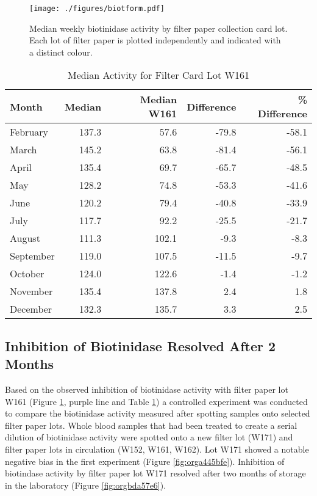 \documentclass[review]{elsarticle}
\begin{document}
\begin{figure}[htbp]
\centering
\texttt{[image: ./figures/biotform.pdf]}
\caption{\label{fig:org25d6d79}Median weekly biotinidase activity by filter paper collection card lot. Each lot of filter paper is plotted independently and indicated with a distinct colour.}
\end{figure}

\clearpage

\begin{table}[ht]
\centering
\begin{tabular}{lrrrr}
  \hline
Month & Median & Median W161 & Difference & \% Difference \\ 
  \hline
February & 137.3 & 57.6 & -79.8 & -58.1 \\ 
  March & 145.2 & 63.8 & -81.4 & -56.1 \\ 
  April & 135.4 & 69.7 & -65.7 & -48.5 \\ 
  May & 128.2 & 74.8 & -53.3 & -41.6 \\ 
  June & 120.2 & 79.4 & -40.8 & -33.9 \\ 
  July & 117.7 & 92.2 & -25.5 & -21.7 \\ 
  August & 111.3 & 102.1 & -9.3 & -8.3 \\ 
  September & 119.0 & 107.5 & -11.5 & -9.7 \\ 
  October & 124.0 & 122.6 & -1.4 & -1.2 \\ 
  November & 135.4 & 137.8 & 2.4 & 1.8 \\ 
  December & 132.3 & 135.7 & 3.3 & 2.5 \\ 
   \hline
\end{tabular}
\caption{Median Activity for Filter Card Lot W161} 
\label{tab:w161_months}
\end{table}

\subsection*{Inhibition of Biotinidase Resolved After 2 Months}
\label{sec:orgcb7f1cf}
Based on the observed inhibition of biotinidase activity with filter
paper lot W161 (Figure \ref{fig:org25d6d79}, purple line and Table
\ref{tab:w161_months}) a controlled experiment was conducted to
compare the biotinidase activity measured after spotting samples onto
selected filter paper lots. Whole blood samples that had been treated
to create a serial dilution of biotinidase activity were spotted onto
a new filter lot (W171) and filter paper lots in circulation (W152,
W161, W162). Lot W171 showed a notable negative bias in the first experiment (Figure
\ref{fig:orga445bfe}). Inhibition of biotindase activity by filter paper lot W171
resolved after two months of storage in the laboratory (Figure
\ref{fig:orgbda57e6}).
\end{document}

